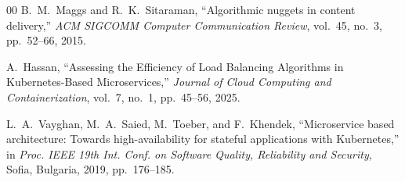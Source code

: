 \documentclass[conference]{IEEEtran}
\begin{document}
\begin{thebibliography}{00}
B.~M.~Maggs and R.~K.~Sitaraman, ``Algorithmic nuggets in content delivery,'' \textit{ACM SIGCOMM Computer Communication Review}, vol.~45, no.~3, pp.~52--66, 2015.

A.~Hassan, ``Assessing the Efficiency of Load Balancing Algorithms in Kubernetes-Based Microservices,'' \textit{Journal of Cloud Computing and Containerization}, vol.~7, no.~1, pp.~45--56, 2025.

L.~A.~Vayghan, M.~A.~Saied, M.~Toeber, and F.~Khendek, ``Microservice based architecture: Towards high-availability for stateful applications with Kubernetes,'' in \textit{Proc. IEEE 19th Int. Conf. on Software Quality, Reliability and Security}, Sofia, Bulgaria, 2019, pp.~176--185.

\end{thebibliography}
\end{document}
